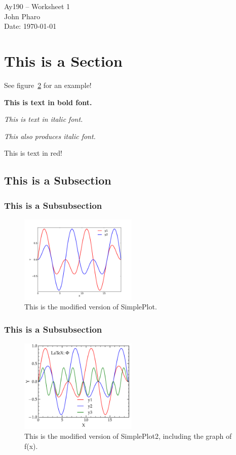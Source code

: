 \documentclass[11pt,letterpaper]{article}
\begin{document}
\begin{center}
\Large
Ay190 -- Worksheet 1\\
John Pharo\\
Date: \today
\end{center}

\section{This is a Section}

See figure~\ref{fig:simpleplot2} for an example!

{\bf This is text in bold font.}

\emph{This is text in italic font.}

{\it This also produces italic font.}

{\color{red} This is text in red!}

\subsection{This is a Subsection}

\subsubsection{This is a Subsubsection}

\begin{figure}[bth]
\centering
\includegraphics[width=0.5\textwidth]{simpleplot.pdf}
\caption{This is the modified version of SimplePlot.}
\label{fig:simpleplot}
\end{figure}

\subsubsection{This is a Subsubsection}

\begin{figure}[bth]
\centering
\includegraphics[width=0.5\textwidth]{simpleplot2.pdf}
\caption{This is the modified version of SimplePlot2, including the graph of f(x).}
\label{fig:simpleplot2}
\end{figure}
\end{document}

